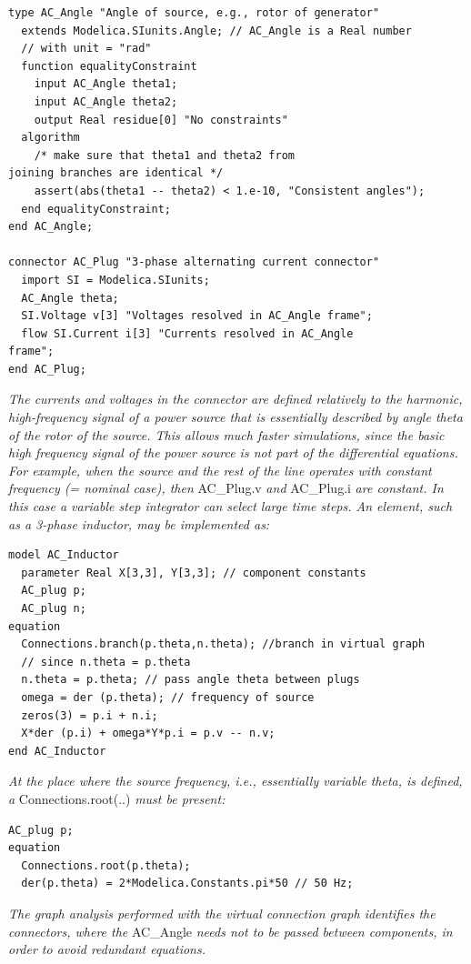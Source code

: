 \documentclass[10pt,a4paper]{report}
\begin{document}
\begin{lstlisting}[language=modelica]
type AC_Angle "Angle of source, e.g., rotor of generator"
  extends Modelica.SIunits.Angle; // AC_Angle is a Real number
  // with unit = "rad"
  function equalityConstraint
    input AC_Angle theta1;
    input AC_Angle theta2;
    output Real residue[0] "No constraints"
  algorithm
    /* make sure that theta1 and theta2 from
joining branches are identical */
    assert(abs(theta1 -- theta2) < 1.e-10, "Consistent angles");
  end equalityConstraint;
end AC_Angle;

connector AC_Plug "3-phase alternating current connector"
  import SI = Modelica.SIunits;
  AC_Angle theta;
  SI.Voltage v[3] "Voltages resolved in AC_Angle frame";
  flow SI.Current i[3] "Currents resolved in AC_Angle
frame";
end AC_Plug;
\end{lstlisting}
\emph{The currents and voltages in the connector are defined relatively
to the harmonic, high-frequency signal of a power source that is
essentially described by angle theta of the rotor of the source. This
allows much faster simulations, since the basic high frequency signal of
the power source is not part of the differential equations. For example,
when the source and the rest of the line operates with constant
frequency (= nominal case), then} AC\_Plug.v \emph{and} AC\_Plug.i
\emph{are constant. In this case a variable step integrator can select
large time steps. An element, such as a 3-phase inductor, may be
implemented as:}

\begin{lstlisting}[language=modelica]
model AC_Inductor
  parameter Real X[3,3], Y[3,3]; // component constants
  AC_plug p;
  AC_plug n;
equation
  Connections.branch(p.theta,n.theta); //branch in virtual graph
  // since n.theta = p.theta
  n.theta = p.theta; // pass angle theta between plugs
  omega = der (p.theta); // frequency of source
  zeros(3) = p.i + n.i;
  X*der (p.i) + omega*Y*p.i = p.v -- n.v;
end AC_Inductor
\end{lstlisting}
\emph{At the place where the source frequency, i.e., essentially
variable theta, is defined, a} Connections.root(..) \emph{must be
present:}

\begin{lstlisting}[language=modelica]
  AC_plug p;
equation
  Connections.root(p.theta);
  der(p.theta) = 2*Modelica.Constants.pi*50 // 50 Hz;
\end{lstlisting}
\emph{The graph analysis performed with the virtual connection graph
identifies the connectors, where the} AC\_Angle \emph{needs not to be
passed between components, in order to avoid redundant equations.}
\end{document}
